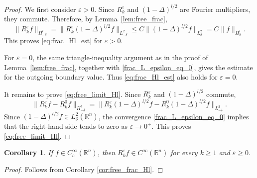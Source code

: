 \documentclass[12pt,a4paper]{amsart}
\numberwithin{equation}{section}
\theoremstyle{plain}
\newtheorem{corollary}[theorem]{Corollary}
\theoremstyle{definition}
\begin{document}
\begin{proof}
We first consider $\varepsilon >0$. Since $R_k^\varepsilon$ and
$(1-\Delta)^{l/2}$ are Fourier multipliers, they commute. Therefore, by Lemma~\ref{lem:free_frac},
\begin{equation*}
    \|R_k^\varepsilon f\|_{H^l_{-\delta}}
    =
    \|R_k^\varepsilon (1-\Delta)^{l/2}f\|_{L^2_{-\delta}} 
    \leq
    C\|(1-\Delta)^{l/2}f\|_{L^2_\delta}  
    =
    C\|f\|_{H^l_\delta}.
\end{equation*}
This proves \eqref{eq:frac_Hl_est} for $\varepsilon >0$.

For $\varepsilon=0$, the same triangle-inequality argument as in the proof of
Lemma~\ref{lem:free_frac}, together with \eqref{frac_L_epsilon_eq_0}, gives
the estimate for the outgoing boundary value. Thus \eqref{eq:frac_Hl_est}
also holds for $\varepsilon=0$.

It remains to prove \eqref{eq:free_limit_Hl}. Since $R_k^\varepsilon$ and
$(1-\Delta)^{l/2}$ commute,
\[
    \|R_k^\varepsilon f-R_k^0 f\|_{H^l_{-\delta}}
    =
    \|R_k^\varepsilon (1-\Delta)^{l/2}f
      -R_k^0 (1-\Delta)^{l/2}f\|_{L^2_{-\delta}}.
\]
Since $(1-\Delta)^{l/2}f\in L^2_\delta(\mathbb R^n)$, the convergence
\eqref{frac_L_epsilon_eq_0} implies that the right-hand side tends to zero as
$\varepsilon\to0^+$. This proves \eqref{eq:free_limit_Hl}.
\end{proof}

\begin{corollary}\label{cor:r_smooth}
    If $f\in C_c^\infty(\mathbb{R}^n)$, then $R_k^\varepsilon f \in C^\infty(\mathbb{R}^n)$ for every
$k\geq 1$ and $\varepsilon \geq 0$.
\end{corollary}
\begin{proof}
    Follows from Corollary \ref{cor:free_frac_Hl}.
\end{proof}
\end{document}
